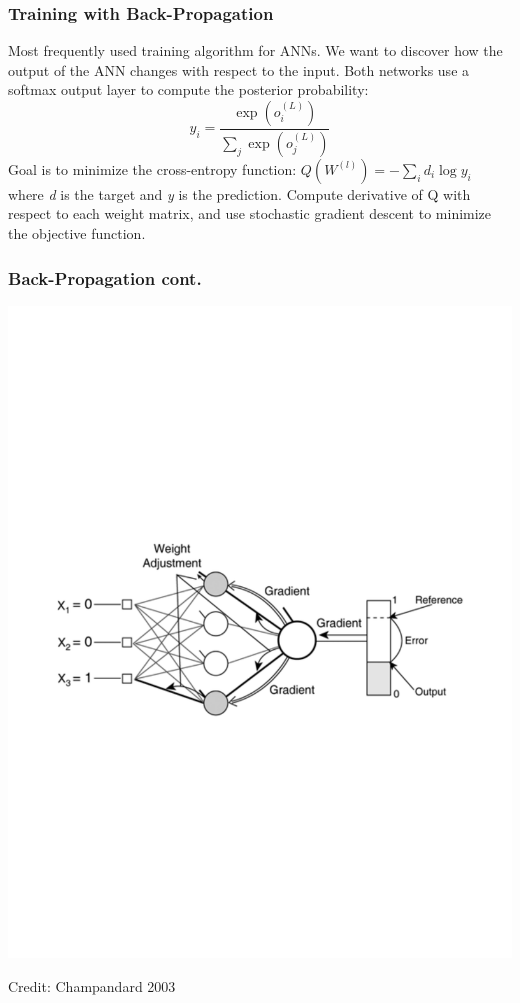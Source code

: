 \documentclass[notes]{beamer}
\begin{document}
\begin{frame}
	\frametitle{Training with Back-Propagation}
	\begin{center}
		Most frequently used training algorithm for ANNs. We want to discover how the output of the ANN changes with respect to the input. Both networks use a softmax output layer to compute the posterior probability:
		\begin{equation*}
		y_{i} = \frac{\exp(o_{i}^{(L)})}{\sum_{j}\exp(o_{j}^{(L)})}
		\end{equation*}
		Goal is to minimize the cross-entropy function: $Q({W^{(l)}}) = -\sum_{i}d_{i}\log y_{i}$ where \textit{d} is the target and \textit{y} is the prediction.
		\vfill
		Compute derivative of Q with respect to each weight matrix, and use stochastic gradient descent to minimize the objective function.
	\end{center}
\end{frame}

\begin{frame}
	\frametitle{Back-Propagation cont.}
	\includegraphics[scale=0.65, trim=2cm 9cm 0cm 8cm, clip=true]{backprop.pdf}
	\begin{center}
		\tiny{Credit: Champandard 2003}
	\end{center}
\end{frame}
\end{document}
